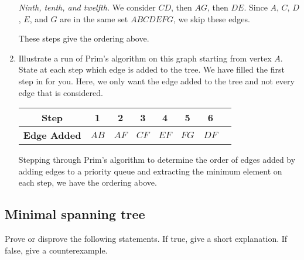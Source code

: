 \begin{enumerate}
\begin{solution}
\textit{Ninth, tenth, and twelfth. }We consider $CD$, then $AG$, then $DE$. Since $A$, $C$, $D$, $E$, and $G$ are in the same set $ABCDEFG$, we skip these edges.

These steps give the ordering above.
\end{solution}
\item Illustrate a run of Prim's algorithm on this graph starting from vertex $A$. State at each step which edge is added to the tree. We have filled the first step in for you. Here, we only want the edge added to the tree and not every edge that is considered. 

\begin{center}
\begin{tabular}{c|c|c|c|c|c|c|c}
     \textbf{Step} & 1 & 2 & 3 & 4 & 5 & 6\\
     \hline
     \textbf{Edge Added} & $AB$ & $AF$ & $CF$ & $EF$ & $FG$ & $DF$\\
\end{tabular}
\end{center}
\begin{solution}
Stepping through Prim's algorithm to determine the order of edges added by adding edges to a priority queue and extracting the minimum element on each step, we have the ordering above.
\end{solution}
\end{enumerate}
\newpage
\subsection{Minimal spanning tree}
Prove or disprove the following statements. If true, give a short explanation. If false, give a counterexample.

